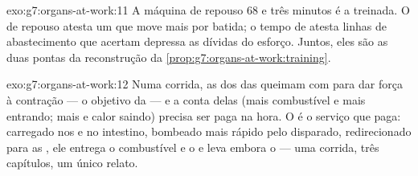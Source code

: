 \begin{solution}{exo:g7:organs-at-work:11}
A máquina de repouso $68$ e três minutos é a treinada. O  de
repouso atesta um  que move mais por batida; o tempo de
 atesta linhas de abastecimento que acertam depressa as
dívidas do esforço. Juntos, eles são as duas pontas da reconstrução da
\cref{prop:g7:organs-at-work:training}.
\end{solution}

\begin{solution}{exo:g7:organs-at-work:12}
Numa corrida, as  dos  das  queimam  com
 para dar força à contração --- o objetivo da  --- e a
conta delas (mais combustível e mais  entrando; mais  e calor saindo) precisa ser paga na hora. O  é o
serviço que paga: carregado nos  e no intestino, bombeado mais
rápido pelo  disparado, redirecionado para as , ele
entrega o combustível e o  e leva embora o  ---
uma corrida, três capítulos, um único relato.
\end{solution}

